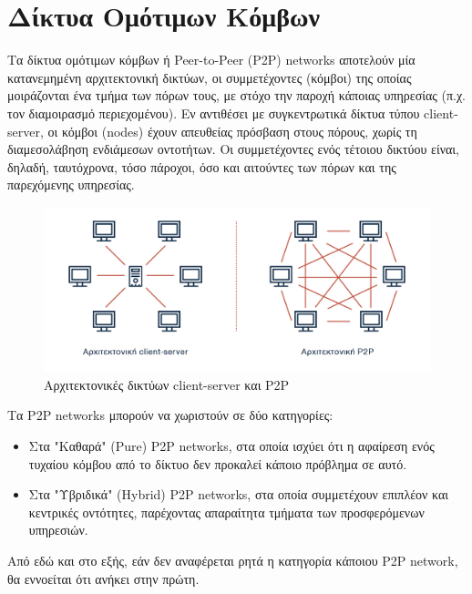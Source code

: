 \section{Δίκτυα Ομότιμων Κόμβων} \label{section:2-4-p2p-networks}

Τα δίκτυα ομότιμων κόμβων ή Peer-to-Peer (P2P) networks αποτελούν μία κατανεμημένη αρχιτεκτονική δικτύων, οι συμμετέχοντες (κόμβοι) της οποίας μοιράζονται ένα τμήμα των πόρων τους, με στόχο την παροχή κάποιας υπηρεσίας (π.χ. τον διαμοιρασμό περιεχομένου). Εν αντιθέσει με συγκεντρωτικά δίκτυα τύπου client-server, οι κόμβοι (nodes) έχουν απευθείας πρόσβαση στους πόρους, χωρίς τη διαμεσολάβηση ενδιάμεσων οντοτήτων. Οι συμμετέχοντες ενός τέτοιου δικτύου είναι, δηλαδή, ταυτόχρονα, τόσο πάροχοι, όσο και αιτούντες των πόρων και της παρεχόμενης υπηρεσίας.\cite{2.4-p2p-networking}

\begin{figure}[H]
	\centering
	\includegraphics[width=.95\textwidth]{assets/figures/chapter-2/2.4.p2p-networks}
	\caption{Αρχιτεκτονικές δικτύων client-server και P2P}
\end{figure}

Τα P2P networks μπορούν να χωριστούν σε δύο κατηγορίες:

\begin{itemize}
	\item Στα "Καθαρά" (Pure) P2P networks, στα οποία ισχύει ότι η αφαίρεση ενός τυχαίου κόμβου από το δίκτυο δεν προκαλεί κάποιο πρόβλημα σε αυτό.
	\item Στα "Υβριδικά" (Hybrid) P2P networks, στα οποία συμμετέχουν επιπλέον και κεντρικές οντότητες, παρέχοντας απαραίτητα τμήματα των προσφερόμενων υπηρεσιών.
\end{itemize}

Από εδώ και στο εξής, εάν δεν αναφέρεται ρητά η κατηγορία κάποιου P2P network, θα εννοείται ότι ανήκει στην πρώτη.